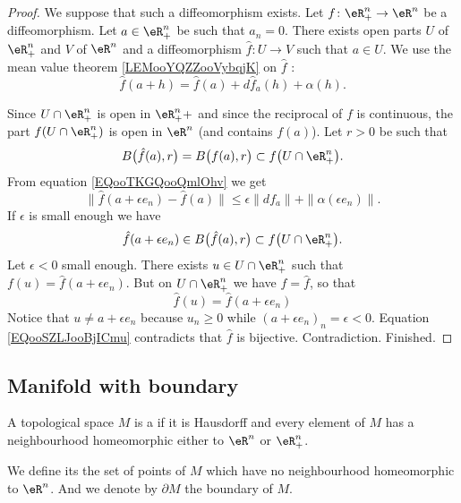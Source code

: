 \begin{proof}
	We suppose that such a diffeomorphism exists. Let \(f \colon \eR^n_+\to \eR^n  \) be a diffeomorphism. Let \( a\in \eR^n_+\) be such that \( a_n=0\). There exists open parts \( U\) of \( \eR^n_+\) and \( V\) of \( \eR^n\) and a diffeomorphism \(\hat f \colon U\to V  \) such that \( a\in U\). We use the mean value theorem \ref{LEMooYQZZooVybqjK} on \( \hat f\) :
	\begin{equation}	\label{EQooTKGQooQmlOhv}
		\hat f(a+h)=\hat f(a)+d\hat f_a(h)+\alpha(h).
	\end{equation}

	Since \( U\cap \eR^n_+\) is open in \( \eR^n_++\) and since the reciprocal of \( f\) is continuous, the part \( f(U\cap \eR^n_+)\) is open in \( \eR^n\) (and contains \( f(a)\)). Let \( r>0\) be such that
	\begin{equation}
		B\big( \hat f(a), r \big)=   B\big( f(a),r \big)\subset f\big( U\cap \eR^n_+ \big).
	\end{equation}
	From equation \eqref{EQooTKGQooQmlOhv} we get
	\begin{equation}
		\| \hat f(a+\epsilon e_n)-\hat f(a) \|\leq \epsilon\| df_a \|+\| \alpha(\epsilon e_n) \|.
	\end{equation}
	If \( \epsilon\) is small enough we have
	\begin{equation}
		\hat f(a+\epsilon e_n)\in B\big( \hat f(a),r \big)\subset f\big( U\cap \eR^n_+ \big).
	\end{equation}
	Let \( \epsilon<0\) small enough. There exists \( u\in U\cap \eR^n_+\) such that \( f(u)=\hat f(a+\epsilon e_n)\). But on \( U\cap \eR^n_+\) we have \( f=\hat f\), so that
	\begin{equation}		\label{EQooSZLJooBjICmu}
		\hat f(u)=\hat f(a+\epsilon e_n)
	\end{equation}
	Notice that \( u\neq a+\epsilon e_n\) because \( u_n\geq 0\) while \( (a+\epsilon e_n)_n=\epsilon<0\). Equation \eqref{EQooSZLJooBjICmu} contradicts that \( \hat f\) is bijective. Contradiction. Finished.
\end{proof}

\subsection{Manifold with boundary}

\begin{definition}	\label{DEFooNETXooZaZMcm}
	A topological space \( M\) is a  if it is Hausdorff and every element of \( M\) has a neighbourhood homeomorphic either to \( \eR^n\) or \( \eR^{n}_+\).

	We define its  the set of points of \( M\) which have no neighbourhood homeomorphic to \( \eR^n\). And we denote by \( \partial M\) the boundary of \( M\).
\end{definition}

